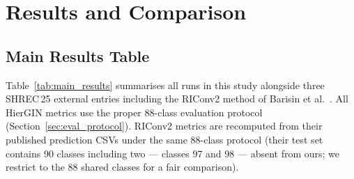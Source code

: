 \section{Results and Comparison}
\label{sec:results}

\subsection{Main Results Table}

Table~\ref{tab:main_results} summarises all runs in this study alongside
three SHREC\,25 external entries including the RIConv2 method of Barisin
et al.~\cite{riconv2}.
All HierGIN metrics use the proper 88-class evaluation protocol
(Section~\ref{sec:eval_protocol}).
RIConv2 metrics are recomputed from their published prediction CSVs under
the same 88-class protocol (their test set contains 90 classes including
two --- classes 97 and 98 --- absent from ours; we restrict to the 88 shared
classes for a fair comparison).

